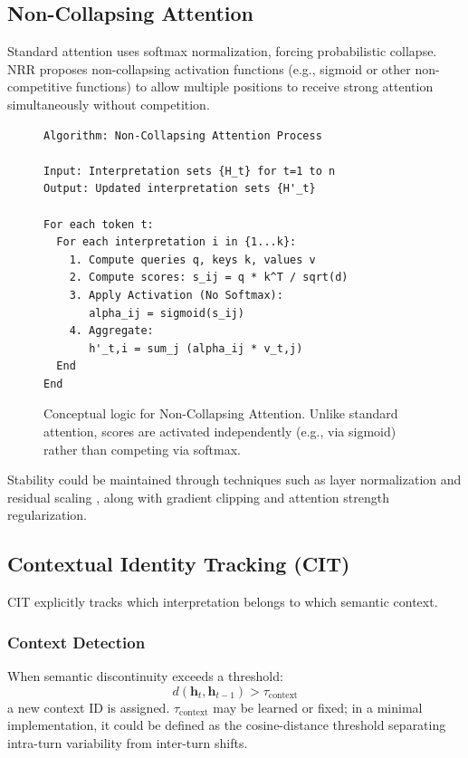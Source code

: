 \documentclass[11pt,a4paper]{article}
\begin{document}
\subsection{Non-Collapsing Attention}

Standard attention uses softmax normalization, forcing probabilistic collapse.
NRR proposes non-collapsing activation functions (e.g., sigmoid or other non-competitive functions) to allow multiple positions to receive strong attention simultaneously without competition.

\begin{figure}[ht]
\centering
\begin{verbatim}
Algorithm: Non-Collapsing Attention Process

Input: Interpretation sets {H_t} for t=1 to n
Output: Updated interpretation sets {H'_t}

For each token t:
  For each interpretation i in {1...k}:
    1. Compute queries q, keys k, values v
    2. Compute scores: s_ij = q * k^T / sqrt(d)
    3. Apply Activation (No Softmax):
       alpha_ij = sigmoid(s_ij)
    4. Aggregate:
       h'_t,i = sum_j (alpha_ij * v_t,j)
  End
End
\end{verbatim}
\caption{Conceptual logic for Non-Collapsing Attention.
Unlike standard attention, scores are activated independently (e.g., via sigmoid) rather than competing via softmax.}
\label{fig:attention_logic}
\end{figure}

Stability could be maintained through techniques such as layer normalization \cite{ba2016layer} and residual scaling \cite{bachlechner2020rezero}, along with gradient clipping and attention strength regularization.

\subsection{Contextual Identity Tracking (CIT)}

CIT explicitly tracks which interpretation belongs to which semantic context.

\subsubsection{Context Detection}
When semantic discontinuity exceeds a threshold:
\begin{equation}
d(\mathbf{h}_t, \mathbf{h}_{t-1}) > \tau_{\text{context}}
\end{equation}
a new context ID is assigned.
$\tau_{\text{context}}$ may be learned or fixed; in a minimal implementation, it could be defined as the cosine-distance threshold separating intra-turn variability from inter-turn shifts.
\end{document}
